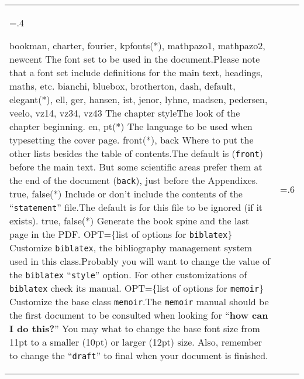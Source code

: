 \begin{xltabular}{\linewidth}{>{\hsize=.4\hsize\raggedright\arraybackslash}X>{\hsize=.6\hsize}X}
    
    
    
    {bookman, charter, fourier, kpfonts(*), mathpazo1, mathpazo2, newcent}%
    {The font set to be used in the document.}{Please note that a font set include definitions for the main text, headings, maths, etc.}
    \midrule
    {bianchi, bluebox, brotherton, dash, default, elegant(*), ell, ger, hansen, ist, jenor, lyhne, madsen, pedersen, veelo, vz14, vz34, vz43}%
    {The chapter style}{The look of the chapter beginning.}
    \midrule
    {en, pt(*)}%
    {The language to be used when typesetting the cover page.}{}
    \midrule
    {front(*), back}%
    {Where to put the other lists besides the table of contents.}{The default is (\texttt{front}) before the main text.  But some scientific areas prefer them at the end of the document (\texttt{back}), just before the Appendixes.}
    \midrule
    {true, false(*)}%
    {Include or don't include the contents of the “\texttt{statement}” file.}{The default is for this file to be ignored (if it exists).}
    \midrule
    {true, false(*)}%
    {Generate the book spine and the last page in the PDF.}{}
    \midrule
    {OPT=\{list of options for \texttt{biblatex}\}}%
    {Customize \texttt{biblatex}, the bibliography management system used in this class.}{Probably you will want to change the value of the \texttt{biblatex} “\texttt{style}” option. For other customizations of \texttt{biblatex} check its manual.}
    \midrule
    {OPT=\{list of options for \texttt{memoir}\}}%
    {Customize the base class \texttt{memoir}.}{The \texttt{memoir} manual should be the first document to be consulted when looking for “\textbf{how can I do this?}” You may what to change the base font size from 11pt to a smaller (10pt) or larger (12pt) size.  Also, remember to change the “\texttt{draft}” to final when your document is finished.}
    \midrule
    \bottomrule
\end{xltabular}
\egroup

